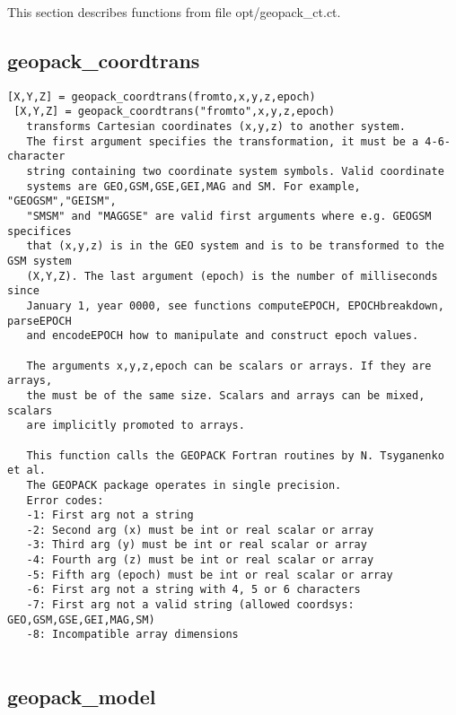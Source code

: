 \documentclass[a4paper]{article}
\begin{document}
This section describes functions from file opt/geopack\_ct.ct.




\subsection{geopack\_coordtrans\label{geopack_coordtrans}}

\begin{tscreen}
\begin{verbatim}
[X,Y,Z] = geopack_coordtrans(fromto,x,y,z,epoch)
 [X,Y,Z] = geopack_coordtrans("fromto",x,y,z,epoch)
   transforms Cartesian coordinates (x,y,z) to another system.
   The first argument specifies the transformation, it must be a 4-6-character
   string containing two coordinate system symbols. Valid coordinate
   systems are GEO,GSM,GSE,GEI,MAG and SM. For example, "GEOGSM","GEISM",
   "SMSM" and "MAGGSE" are valid first arguments where e.g. GEOGSM specifices
   that (x,y,z) is in the GEO system and is to be transformed to the GSM system
   (X,Y,Z). The last argument (epoch) is the number of milliseconds since
   January 1, year 0000, see functions computeEPOCH, EPOCHbreakdown, parseEPOCH
   and encodeEPOCH how to manipulate and construct epoch values.

   The arguments x,y,z,epoch can be scalars or arrays. If they are arrays,
   the must be of the same size. Scalars and arrays can be mixed, scalars
   are implicitly promoted to arrays.

   This function calls the GEOPACK Fortran routines by N. Tsyganenko et al.
   The GEOPACK package operates in single precision.
   Error codes:
   -1: First arg not a string
   -2: Second arg (x) must be int or real scalar or array
   -3: Third arg (y) must be int or real scalar or array
   -4: Fourth arg (z) must be int or real scalar or array
   -5: Fifth arg (epoch) must be int or real scalar or array
   -6: First arg not a string with 4, 5 or 6 characters
   -7: First arg not a valid string (allowed coordsys: GEO,GSM,GSE,GEI,MAG,SM)
   -8: Incompatible array dimensions
 
\end{verbatim}
\end{tscreen}



\subsection{geopack\_model\label{geopack_model}}
\end{document}
